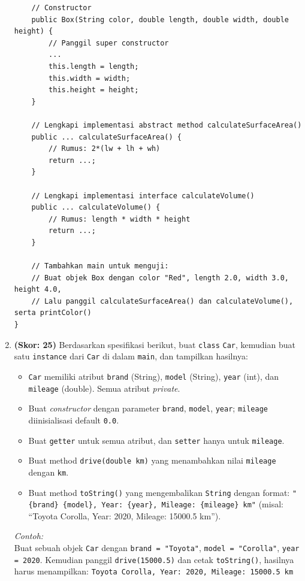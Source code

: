 \documentclass[10pt,openany,a4paper]{article}
\begin{document}
\begin{enumerate}
\begin{verbatim}
    // Constructor
    public Box(String color, double length, double width, double height) {
        // Panggil super constructor
        ...
        this.length = length;
        this.width = width;
        this.height = height;
    }
    
    // Lengkapi implementasi abstract method calculateSurfaceArea()
    public ... calculateSurfaceArea() {
        // Rumus: 2*(lw + lh + wh)
        return ...;
    }

    // Lengkapi implementasi interface calculateVolume()
    public ... calculateVolume() {
        // Rumus: length * width * height
        return ...;
    }

    // Tambahkan main untuk menguji:
    // Buat objek Box dengan color "Red", length 2.0, width 3.0, height 4.0,
    // Lalu panggil calculateSurfaceArea() dan calculateVolume(), serta printColor()
}
    \end{verbatim}

    \item \textbf{(Skor: 25)}  
    Berdasarkan spesifikasi berikut, buat \texttt{class} \texttt{Car}, kemudian buat satu \texttt{instance} dari \texttt{Car} di dalam \texttt{main}, dan tampilkan hasilnya:
    \begin{itemize}
        \item \texttt{Car} memiliki atribut \texttt{brand} (String), \texttt{model} (String), \texttt{year} (int), dan \texttt{mileage} (double). Semua atribut \textit{private}.
        \item Buat \textit{constructor} dengan parameter \texttt{brand}, \texttt{model}, \texttt{year}; \texttt{mileage} diinisialisasi default \texttt{0.0}.
        \item Buat \texttt{getter} untuk semua atribut, dan \texttt{setter} hanya untuk \texttt{mileage}.
        \item Buat method \texttt{drive(double km)} yang menambahkan nilai \texttt{mileage} dengan \texttt{km}.
        \item Buat method \texttt{toString()} yang mengembalikan \texttt{String} dengan format:  
        \texttt{"\{brand\} \{model\}, Year: \{year\}, Mileage: \{mileage\} km"}  
        (misal: ``Toyota Corolla, Year: 2020, Mileage: 15000.5 km'').
    \end{itemize}
    \noindent
    \textit{Contoh:}\\
    Buat sebuah objek \texttt{Car} dengan \texttt{brand = "Toyota"}, \texttt{model = "Corolla"}, \texttt{year = 2020}. Kemudian panggil \texttt{drive(15000.5)} dan cetak \texttt{toString()}, hasilnya harus menampilkan:  
    \texttt{Toyota Corolla, Year: 2020, Mileage: 15000.5 km}
    

\end{enumerate}
\end{document}
